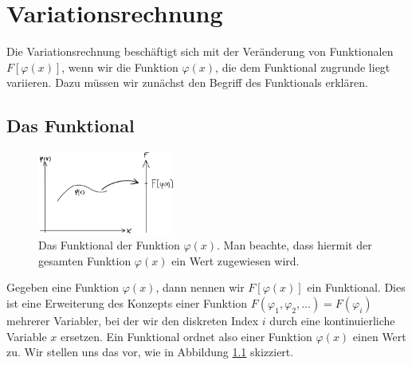 \chapter{Variationsrechnung}\label{chap:Variationsrechnung}
Die Variationsrechnung beschäftigt sich mit der Veränderung von Funktionalen
$F[\varphi(x)]$, wenn wir die Funktion $\varphi(x)$, die dem Funktional
zugrunde liegt variieren. Dazu müssen wir zunächst den Begriff des
Funktionals erklären.  

\section{Das Funktional}\label{sec:DasFunktional}
\begin{figure}
 \begin{center}
  \includegraphics[width=0.4\textwidth]{fig/Funktional.png}
  \caption{Das Funktional der Funktion $\varphi(x)$. Man beachte, dass hiermit
  der gesamten Funktion $\varphi(x)$ ein Wert zugewiesen
  wird.\label{fig:functional}}
 \end{center}
\end{figure}
Gegeben eine Funktion $\varphi(x)$, dann nennen wir $F[\varphi(x)]$ ein
Funktional. Dies ist eine Erweiterung des Konzepts einer Funktion
$F(\varphi_1,\varphi_2,\dots)=F(\varphi_i)$ mehrerer Variabler, bei der wir den
diskreten Index $i$ durch eine kontinuierliche Variable $x$ ersetzen. Ein
Funktional ordnet also einer Funktion $\varphi(x)$ einen Wert zu. Wir stellen
uns das vor, wie in Abbildung \ref{fig:functional} skizziert.\\
\\
\\
\\
\\
\\
\\
\\
\\

